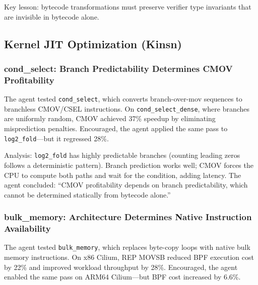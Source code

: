 \documentclass[sigplan,10pt,anonymous,nonacm]{acmart}
\begin{document}
Key lesson: bytecode transformations must preserve verifier type invariants that are invisible in bytecode alone.

\subsection{Kernel JIT Optimization (Kinsn)}

\subsubsection{cond\_select: Branch Predictability Determines CMOV Profitability}

The agent tested \texttt{cond\_select}, which converts branch-over-mov sequences to branchless CMOV/CSEL instructions. On \texttt{cond\_select\_dense}, where branches are uniformly random, CMOV achieved 37\% speedup by eliminating misprediction penalties. Encouraged, the agent applied the same pass to \texttt{log2\_fold}---but it regressed 28\%.

Analysis: \texttt{log2\_fold} has highly predictable branches (counting leading zeros follows a deterministic pattern). Branch prediction works well; CMOV forces the CPU to compute both paths and wait for the condition, adding latency. The agent concluded: ``CMOV profitability depends on branch predictability, which cannot be determined statically from bytecode alone.''

\subsubsection{bulk\_memory: Architecture Determines Native Instruction Availability}

The agent tested \texttt{bulk\_memory}, which replaces byte-copy loops with native bulk memory instructions. On x86 Cilium, REP MOVSB reduced BPF execution cost by 22\% and improved workload throughput by 28\%. Encouraged, the agent enabled the same pass on ARM64 Cilium---but BPF cost increased by 6.6\%.
\end{document}
